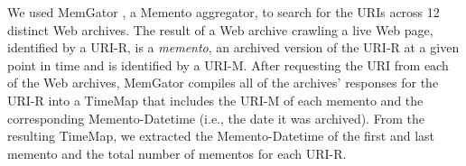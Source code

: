 

We used MemGator \cite{jcdl-alam-memgator}, a Memento \cite{RFC7089} aggregator, to search for the URIs across 12 distinct Web archives. The result of a Web archive crawling a live Web page, identified by a URI-R, is a \emph{memento}, an archived version of the URI-R at a given point in time and is identified by a URI-M. After requesting the URI from each of the Web archives, MemGator compiles all of the archives' responses for the URI-R into a TimeMap that includes the URI-M of each memento and the corresponding Memento-Datetime (i.e., the date it was archived). 
From the resulting TimeMap, we extracted the Memento-Datetime of the first and last memento and the total number of mementos for each URI-R.   



